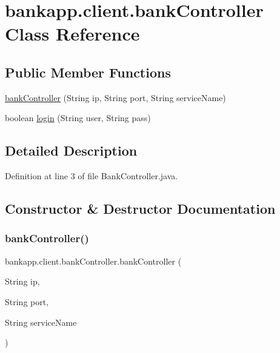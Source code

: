 \hypertarget{classbankapp_1_1client_1_1bank_controller}{}\section{bankapp.\+client.\+bank\+Controller Class Reference}
\label{classbankapp_1_1client_1_1bank_controller}
\subsection*{Public Member Functions}
\begin{DoxyCompactItemize}
\item 
\hyperlink{classbankapp_1_1client_1_1bank_controller_a632bf32141520837c5c06a2657a7c230}{bank\+Controller} (String ip, String port, String service\+Name)
\item 
boolean \hyperlink{classbankapp_1_1client_1_1bank_controller_aed80209fad3f3fee830107d259afb445}{login} (String user, String pass)
\end{DoxyCompactItemize}


\subsection{Detailed Description}


Definition at line 3 of file Bank\+Controller.\+java.



\subsection{Constructor \& Destructor Documentation}
\mbox{\label{classbankapp_1_1client_1_1bank_controller_a632bf32141520837c5c06a2657a7c230}} 
\subsubsection{\texorpdfstring{bank\+Controller()}{bankController()}}
{\footnotesize\ttfamily bankapp.\+client.\+bank\+Controller.\+bank\+Controller (\begin{DoxyParamCaption}\item[{String}]{ip,  }\item[{String}]{port,  }\item[{String}]{service\+Name }\end{DoxyParamCaption})}



